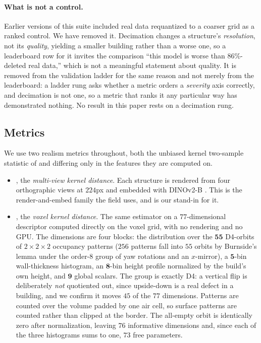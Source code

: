 \paragraph{What is not a control.} Earlier versions of this suite
included real data requantized to a coarser grid as a ranked control. We have
removed it. Decimation changes a structure's \emph{resolution}, not its
\emph{quality}, yielding a smaller building rather than a worse one, so a
leaderboard row for it invites the comparison ``this model is worse than
$86\%$-deleted real data,'' which is not a meaningful statement about quality.
It is removed from the validation ladder for the same reason and not merely from
the leaderboard: a ladder rung asks whether a metric orders a \emph{severity}
axis correctly, and decimation is not one, so a metric that ranks it any
particular way has demonstrated nothing. No result in this paper rests on a
decimation rung.

\subsection{Metrics}
\label{sec:metrics}

We use two realism metrics throughout, both the unbiased kernel two-sample
statistic of \citet{binkowski2018kid} and differing only in the features they
are computed on.

\begin{itemize}[leftmargin=*,itemsep=1pt,topsep=2pt]
\item \textbf{\mvkid{}}, the \emph{multi-view kernel distance}. Each structure is
  rendered from four orthographic views at $224$px and embedded with DINOv2-B
  \citep{oquab2024dinov2}. This is the render-and-embed family the field uses,
  and is our stand-in for it.
\item \textbf{\vkid{}}, the \emph{voxel kernel distance}. The same estimator on a
  $77$-dimensional descriptor computed directly on the voxel grid, with no
  rendering and no GPU. The dimensions are four blocks: the distribution over
  the $\mathbf{55}$ D4-orbits of $2\times2\times2$ occupancy patterns
  ($256$ patterns fall into $55$ orbits by Burnside's lemma under the order-$8$
  group of yaw rotations and an $x$-mirror), a $\mathbf{5}$-bin wall-thickness
  histogram, an $\mathbf{8}$-bin height profile normalized by the build's own
  height, and $\mathbf{9}$ global scalars. The group is exactly D4: a vertical
  flip is deliberately \emph{not} quotiented out, since upside-down is a real
  defect in a building, and we confirm it moves $45$ of the $77$ dimensions.
  Patterns are counted over the volume padded by one air cell, so surface
  patterns are counted rather than clipped at the border. The all-empty orbit is
  identically zero after normalization, leaving $76$ informative dimensions and,
  since each of the three histograms sums to one, $73$ free parameters.
\end{itemize}

